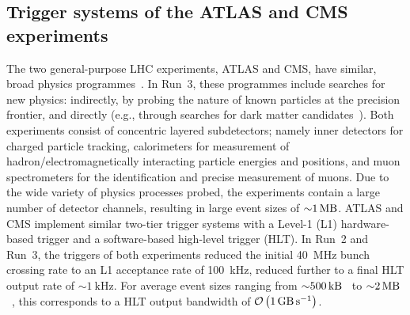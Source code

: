 \subsection{Trigger systems of the ATLAS and CMS experiments}

The two general-purpose LHC experiments, ATLAS and CMS, have similar, broad physics programmes~\cite{ATLASMachine,collaboration2008cms}. In Run~3, these programmes include searches for new physics: indirectly, by probing the nature of known particles at the precision frontier, and directly (e.g.,  through searches for dark matter candidates~\cite{snowmass-darkmatter}). Both experiments consist of concentric layered subdetectors; namely inner detectors for charged particle tracking, calorimeters for measurement of hadron/electromagnetically interacting particle energies and positions, and muon spectrometers for the identification and precise measurement of muons. Due to the wide variety of physics processes probed, the experiments contain a large number of detector channels, resulting in large event sizes of ${\sim}\SI{1}{\mega\byte}$. ATLAS and CMS implement similar two-tier trigger systems with a Level-1 (L1) hardware-based trigger and a software-based high-level trigger (HLT). In Run~2 and Run~3, the triggers of both experiments reduced the initial \SI{40}{\mega\hertz} bunch crossing rate to an L1 acceptance rate of \SI{100}{\kilo\hertz}, reduced further to a final HLT output rate of ${\sim}\SI{1}{\kilo\hertz}$. For average event sizes ranging from ${\sim}\SI{500}{\kilo\byte}$~\cite{ATLASRun3EventBuilder} to ${\sim}\SI{2}{\mega\byte}$~\cite{cmsRun3EventBuilder}, this corresponds to a HLT output bandwidth of $\mathcal{O}\left(\SI{1}{\giga\byte\per\second}\right)$.
